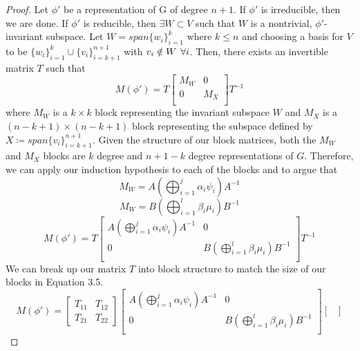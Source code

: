 \documentclass[10pt]{ucthesis}
\begin{document}
\begin{proof}
Let $\phi'$ be a representation of G of degree $n+1$. If $\phi'$ is irreducible, then we are done. If $\phi'$ is reducible, then $\exists W \subset V$ such that $W$ is a nontrivial, $\phi'$-invariant subspace. Let $W = span\{w_i\}_{i=1}^k$ where $k\leq n$ and choosing a basis for $V$ to be $\{w_i\}_{i=1}^k \cup \{v_i\}_{i=k+1}^{n+1}$ with $v_i \notin W \hspace{1.5mm} \forall i$. Then, there exists an invertible matrix $T$ such that
\begin{equation}
	M(\phi') = T\begin{bmatrix}
					M_W& 0\\
					0 & M_{X}\\
					\end{bmatrix}T^{-1}
\end{equation}
where $M_W$ is a $k\times k$ block representing the invariant subspace $W$ and $M_{X}$ is a $(n-k+1)\times (n-k+1)$ block representing the subspace defined by $X \coloneq span\{v_i\}_{i=k+1}^{n+1}$. Given the structure of our block matrices, both the $M_W$ and $M_X$ blocks are $k$ degree and $n+1-k$ degree representations of $G$. Therefore, we can apply our induction hypothesis to each of the blocks and to argue that 
$$M_W = A\left(\bigoplus_{i=1}^j \alpha_i\psi_i \right)A^{-1}$$
$$M_W = B\left(\bigoplus_{i=1}^{l} \beta_i\mu_i  \right)B^{-1}$$
\begin{equation}
	M(\phi') = T\begin{bmatrix}
					A\left(\bigoplus_{i=1}^j \alpha_i\psi_i \right)A^{-1}& 0\\
					0 &  B\left(\bigoplus_{i=1}^{l} \beta_i\mu_i  \right)B^{-1}\\
					\end{bmatrix}T^{-1}
\end{equation}
We can break up our matrix $T$ into block structure to match the size of our blocks in Equation 3.5.
\begin{equation}
	M(\phi') =  \begin{bmatrix}
					T_{11} & T_{12} \\
					T_{21} & T_{22}
				\end{bmatrix}
				\begin{bmatrix}
					A\left(\bigoplus_{i=1}^j \alpha_i\psi_i \right)A^{-1}& 0\\
					0 &  B\left(\bigoplus_{i=1}^{l} \beta_i\mu_i  \right)B^{-1}\\
				\end{bmatrix}
				\begin{bmatrix}

\end{bmatrix}
\end{equation}
\end{proof}
\end{document}
